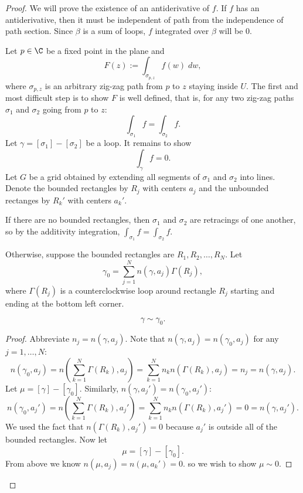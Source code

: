 \begin{proof}
    We will prove the existence of an antiderivative of $f$.
    If $f$ has an antiderivative, then it must be independent
    of path from the independence of path section.
    Since $\beta$ is a sum of loops, $f$ integrated over $\beta$
    will be $0$.

    \noindent
    Let $p \in \C$ be a fixed point in the plane and 
    \[ F(z) := \int_{\sigma_{p, z}} f(w) \; dw, \]
    where $\sigma_{p, z}$ is an arbitrary zig-zag path from
    $p$ to $z$ staying inside $U$.
    The first and most difficult step is to show $F$ is well
    defined, that is, for any two zig-zag paths $\sigma_1$
    and $\sigma_2$ going from $p$ to $z$:
    \[ \int_{\sigma_1} f = \int_{\sigma_2} f. \]
    Let $\gamma = [\sigma_1] - [\sigma_2]$ be a loop.
    It remains to show
    \[ \int_{\gamma} f = 0. \]
    Let $G$ be a grid obtained by extending all segments of $\sigma_1$ 
    and $\sigma_2$ into lines.
    Denote the bounded rectangles by $R_j$ with centers $a_j$
    and the unbounded rectanges by $R_k'$ with centers $a_k'$.

    If there are no bounded rectangles, then $\sigma_1$ and
    $\sigma_2$ are retracings of one another, so by the
    additivity integration, $\int_{\sigma_1} f = \int_{\sigma_2}
    f$.

    Otherwise, suppose the bounded rectangles are $R_1, R_2, 
    \ldots, R_N$.
    Let
    \[ \gamma_0 = \sum_{j=1}^N n(\gamma, a_j) \Gamma(R_j), \]
    where $\Gamma(R_j)$ is a counterclockwise loop around
    rectangle $R_j$ starting and ending at the bottom left 
    corner.
    \begin{claim*}
        \[\gamma \sim \gamma_0. \]
    \end{claim*}
    \begin{proof}
        Abbreviate $n_j = n(\gamma, a_j)$.
        Note that $n(\gamma, a_j) = n(\gamma_0, a_j)$ for
        any $j = 1, \ldots, N$:
        \[ n(\gamma_0, a_j) = n\left( \sum_{k=1}^N \Gamma(R_k),
            a_j \right)
        = \sum_{k=1}^N n_k n(\Gamma(R_k), a_j)
        = n_j = n(\gamma, a_j). \]
        Let $\mu = [\gamma] - [\gamma_0]$.
        Similarly, $n(\gamma, a_j') = n(\gamma_0, a_j')$:
        \[ n(\gamma_0, a_j') = n\left( \sum_{k=1}^N \Gamma(R_k),
            a_j' \right)
        = \sum_{k=1}^N n_k n(\Gamma(R_k), a_j')
        = 0 = n(\gamma, a_j'). \]
        We used the fact that
        $n(\Gamma(R_k), a_j') = 0$ because $a_j'$
        is outside all of the bounded rectangles.
        Now let 
        \[ \mu = [\gamma] - [\gamma_0]. \]
        From above we know $n(\mu, a_j) = n(\mu, a_k') = 0$.
        so we wish to show $\mu \sim 0$.


\end{proof}
\end{proof}
